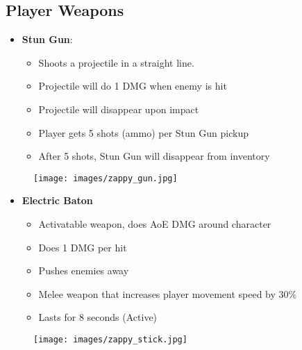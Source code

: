 \documentclass[10pt]{report}
\begin{document}
\subsection{Player Weapons}

\begin{minipage}{.8\linewidth}
    \begin{itemize}
        \item \textbf{Stun Gun}:
        \begin{itemize}
            \item Shoots a projectile in a straight line.
            \item Projectile will do 1 DMG when enemy is hit 
            \item Projectile will disappear upon impact
            \item Player gets 5 shots (ammo) per Stun Gun pickup
            \item After 5 shots, Stun Gun will disappear from inventory
        \end{itemize}
    \end{itemize}
\end{minipage} \hfill
\begin{minipage}{.18\linewidth}
    \begin{figure}[H]
        \centering
        \texttt{[image: images/zappy\_gun.jpg]}
        \caption{}
    \end{figure}
\end{minipage}

\begin{minipage}{.8\linewidth}
    \begin{itemize}
        \item \textbf{Electric Baton}
        \begin{itemize}
            \item Activatable weapon, does AoE DMG around character
            \item Does 1 DMG per hit
            \item Pushes enemies away
            \item Melee weapon that increases player movement speed by 30\%
            \item Lasts for 8 seconds (Active)
        \end{itemize}
    \end{itemize}
\end{minipage} \hfill
\begin{minipage}{.18\linewidth}
    \begin{figure}[H]
        \centering
        \texttt{[image: images/zappy\_stick.jpg]}
        \caption{}
    \end{figure}
\end{minipage}
    
\end{document}
